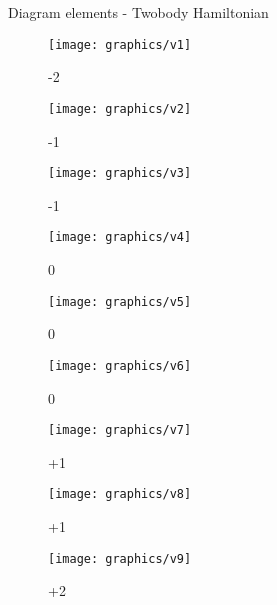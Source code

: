 \begin{frame}{Diagram elements - Twobody Hamiltonian}

    \renewcommand{\figurename}{Level}

    \begin{figure}
    \centering
    \parbox{0.30\textwidth}{
            \centering
            \texttt{[image: graphics/v1]}
            \caption{-2}
        }\quad
        \parbox{0.30\textwidth}{
            \centering
            \texttt{[image: graphics/v2]}
            \caption{-1}
        }\quad
        \parbox{0.30\textwidth}{
            \centering
            \texttt{[image: graphics/v3]}
            \caption{-1}
        }
    \end{figure}

    \begin{figure}
    \centering
    \parbox{0.30\textwidth}{
            \centering
            \texttt{[image: graphics/v4]}
            \caption{0}
        }\quad
        \parbox{0.30\textwidth}{
            \centering
            \texttt{[image: graphics/v5]}
            \caption{0}
        }\quad
        \parbox{0.30\textwidth}{
            \centering
            \texttt{[image: graphics/v6]}
            \caption{0}
        }
    \end{figure}

    \begin{figure}
    \centering
    \parbox{0.30\textwidth}{
            \centering
            \texttt{[image: graphics/v7]}
            \caption{+1}
        }\quad
        \parbox{0.30\textwidth}{
            \centering
            \texttt{[image: graphics/v8]}
            \caption{+1}
        }\quad
        \parbox{0.30\textwidth}{
            \centering
            \texttt{[image: graphics/v9]}
            \caption{+2}
        }
    \end{figure}

\end{frame}

    
